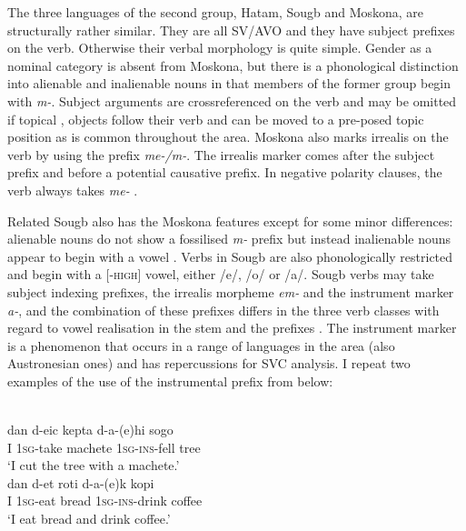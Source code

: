 The three languages of the second group, Hatam, Sougb and Moskona, are structurally rather similar. They are all SV/AVO and they have subject prefixes on the verb. Otherwise their verbal morphology is quite simple. Gender as a nominal category is absent from Moskona, but there is a phonological distinction into alienable and inalienable nouns in that members of the former group begin with \textit{m-}. Subject arguments are crossreferenced on the verb and may be omitted if topical \citep[269]{gravelle2010grammar}, objects follow their verb and can be moved to a pre-posed topic position as is common throughout the area. Moskona also marks irrealis on the verb by using the prefix \textit{me-/m-}. The irrealis marker comes after the subject prefix and before a potential causative prefix. In negative polarity clauses, the verb always takes \textit{me-} \citep[110]{gravelle2010grammar}. 

Related Sougb also has the Moskona features except for some minor differences: alienable nouns do not show a fossilised \textit{m-} prefix but instead inalienable nouns appear to begin with a vowel \citep[218]{reesink2002grammar}. Verbs in Sougb are also phonologically restricted and begin with a [-\textsc{high}] vowel, either /e/, /o/ or /a/. Sougb verbs may take subject indexing prefixes, the irrealis morpheme \textit{em-} and the instrument marker \textit{a-}, and the combination of these prefixes differs in the three verb classes with regard to vowel realisation in the stem and the prefixes \citep{reesink2002grammar}. The instrument marker is a phenomenon that occurs in a range of languages in the area (also Austronesian ones) and has repercussions for SVC analysis. I repeat two examples of the use of the instrumental prefix from \citet{reesink2002grammar} below:

\ea
{}\\
\ea
\gll dan d-eic kepta d-a-(e)hi sogo \\
I \textsc{1}\textsc{sg}-take machete \textsc{1}\textsc{sg}-\textsc{ins}-fell tree \\
\glft `I cut the tree with a machete.' \\ 
\ex \label{sougb1}
\gll dan d-et roti d-a-(e)k kopi \\ 
I \textsc{1}\textsc{sg}-eat bread \textsc{1}\textsc{sg}-\textsc{ins}-drink coffee \\
\glft `I eat bread and drink coffee.'
\z
\z

